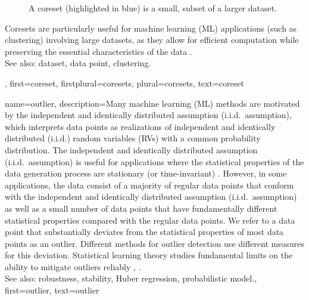 {{{\begin{figure}[H]
\caption{A coreset (highlighted in blue) is a small, subset of a larger dataset. \label{fig_coreset_dict}}
\end{figure}
		Coresets are particularly useful for machine learning (ML) applications (such as clustering) 
		involving large datasets, as they allow for efficient computation while 
		preserving the essential characteristics of the data \cite{DistkmeansBalcan2013}.
				\\
		See also: dataset, data point, clustering.},
	first={coreset},
	firstplural={coresets},
	plural={coresets},
	text={coreset} 
}


{name={outlier}, 
	description={Many machine learning (ML) methods 
		are motivated by the independent and identically distributed assumption (i.i.d.\ assumption), which interprets data points as realizations of 
		independent and identically distributed (i.i.d.) random variables (RVs) with a common probability distribution. The independent and identically distributed assumption (i.i.d.\ assumption) is useful for applications  
		where the statistical properties of the data generation process are stationary (or time-invariant) \cite{Brockwell91}. 
		However, in some applications, the data consist of a majority of regular data points 
		that conform with the independent and identically distributed assumption (i.i.d.\ assumption) as well as a small number of data points that have fundamentally different 
       		statistical properties compared with the regular data points. We refer to a data point that 
        		substantially deviates from the statistical properties of most data points as an 
        		outlier. Different methods for outlier detection use different measures for this deviation. 
        		Statistical learning theory studies fundamental limits on the ability to mitigate outliers reliably \cite{doi:10.1137/0222052}, \cite{10.1214/20-AOS1961}.
        		\\
		See also: robustness, stability, Huber regression, probabilistic model.},
	 first={outlier},
	 text={outlier} 
}

}
